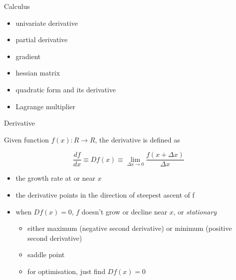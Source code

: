 \documentclass{scrartcl}
\def\tightlist{}
\begin{document}
\begin{frame}{Calculus}
\protect\hypertarget{calculus}{}

\begin{itemize}
\item
  univariate derivative \bigskip
\item
  partial derivative \bigskip
\item
  gradient
\end{itemize}

\bigskip

\begin{itemize}
\tightlist
\item
  hessian matrix
\end{itemize}

\bigskip

\begin{itemize}
\tightlist
\item
  quadratic form and its derivative
\end{itemize}

\bigskip

\begin{itemize}
\tightlist
\item
  Lagrange multiplier
\end{itemize}

\end{frame}

\begin{frame}{Derivative}
\protect\hypertarget{derivative}{}

Given function \(f(x): R\rightarrow R\), the derivative is defined as

\[\frac{df}{dx} \equiv Df(x) \equiv \lim_{\Delta x \rightarrow 0} \frac{f(x+\Delta x)}{\Delta x} \]

\begin{itemize}
\tightlist
\item
  the growth rate at or near \(x\)
\item
  the derivative points in the direction of steepest ascent of f
\item
  when \(Df(x) =0\), \(f\) doesn't grow or decline near \(x\), or
  \emph{stationary}

  \begin{itemize}
  \tightlist
  \item
    either maximum (negative second derivative) or minimum (positive
    second derivative)
  \item
    saddle point
  \item
    for optimisation, just find \(Df(x) = 0\)
  \end{itemize}
\end{itemize}

\end{frame}
\end{document}

